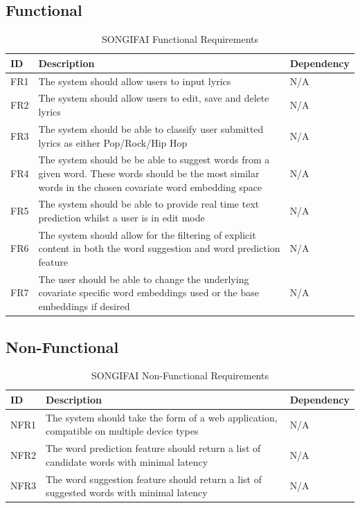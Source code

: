 \subsection{Functional}
\begin{table}[h]
	\centering
	\begin{tabular}{ | l | p{10cm} | l | }
		\hline
		\textbf{ID} & \textbf{Description} & \textbf{Dependency} \\ \hline
		FR1 & The system should allow users to input lyrics & N/A \\ \hline
		FR2 & The system should allow users to edit, save and delete lyrics & N/A  \\ \hline
		FR3 & The system should be able to classify user submitted lyrics as either Pop/Rock/Hip Hop & N/A \\ \hline
		FR4 & The system should be be able to suggest words from a given word. These words should be the most similar words in the chosen covariate word embedding space & N/A \\ \hline
		FR5 & The system should be able to provide real time text prediction whilst a user is in edit mode & N/A \\ \hline
		FR6 & The system should allow for the filtering of explicit content in both the word suggestion and word prediction feature & N/A \\ \hline
		FR7 & The user should be able to change the underlying covariate specific word embeddings used or the base embeddings if desired& N/A \\ \hline
	\end{tabular}
	\label{Tab:Tcru}
	\caption[Functional Requirements]{SONGIFAI Functional Requirements}
\end{table}
\subsection{Non-Functional}
\begin{table}[ht]
\centering
	\begin{tabular}{ | l | p{10cm} | l | }
		\hline
		\textbf{ID} & \textbf{Description} & \textbf{Dependency} \\ \hline
		NFR1 & The system should take the form of a web application, compatible on multiple device types & N/A \\ \hline
		NFR2 & The word prediction feature should return a list of candidate words with minimal latency & N/A \\ \hline
		NFR3 & The word suggestion feature should return a list of suggested words with minimal latency & N/A \\ \hline
	\end{tabular}
	\label{Tab:Tcr}
	\caption[Non-Functional Requirements]{SONGIFAI Non-Functional Requirements}
\end{table}
